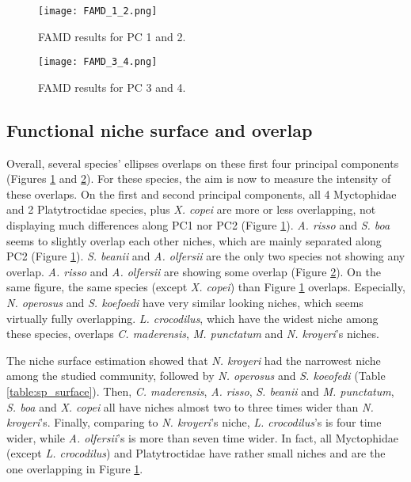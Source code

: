 \begin{figure} [!htbp]
	\begin{center}
		\texttt{[image: FAMD\_1\_2.png]}
	\end{center}
	\caption[FAMD results for first and second axis]{FAMD results for PC 1 and 2.}
	\label{fig:famd12}
\end{figure}

\begin{figure} [!htbp]
	\begin{center}
		\texttt{[image: FAMD\_3\_4.png]}
	\end{center}
	\caption[FAMD results for third and fourth axis]{FAMD results for PC 3 and 4.}
	\label{fig:famd34}
\end{figure}


\subsection{Functional niche surface and overlap}
Overall, several species' ellipses overlaps on these first four principal components (Figures \ref{fig:famd12} and \ref{fig:famd34}). For these species, the aim is now to measure the intensity of these overlaps. On the first and second principal components, all 4 Myctophidae and 2 Platytroctidae species, plus \textit{X. copei} are more or less overlapping, not displaying much differences along PC1 nor PC2 (Figure \ref{fig:famd12}). \textit{A. risso} and \textit{S. boa} seems to slightly overlap each other niches, which are mainly separated along PC2 (Figure \ref{fig:famd12}). \textit{S. beanii} and \textit{A. olfersii} are the only two species not showing any overlap. 
\textit{A. risso} and \textit{A. olfersii} are showing some overlap (Figure \ref{fig:famd34}). On the same figure, the same species (except \textit{X. copei}) than Figure \ref{fig:famd12} overlaps. Especially, \textit{N. operosus} and \textit{S. koefoedi} have very similar looking niches, which seems virtually fully overlapping. \textit{L. crocodilus}, which have the widest niche among these species, overlaps \textit{C. maderensis}, \textit{M. punctatum} and \textit{N. kroyeri}'s niches. 

The niche surface estimation showed that \textit{N. kroyeri} had the narrowest niche among the studied community, followed by \textit{N. operosus} and \textit{S. koeofedi} (Table \ref{table:sp_surface}). Then, \textit{C. maderensis}, \textit{A. risso}, \textit{S. beanii} and \textit{M. punctatum}, \textit{S. boa} and \textit{X. copei} all have niches almost two to three times wider than \textit{N. kroyeri}'s. Finally, comparing to \textit{N. kroyeri}'s niche, \textit{L. crocodilus}'s is four time wider, while \textit{A. olfersii}'s is more than seven time wider. In fact, all Myctophidae (except \textit{L. crocodilus}) and Platytroctidae have rather small niches and are the one overlapping in Figure \ref{fig:famd12}.

